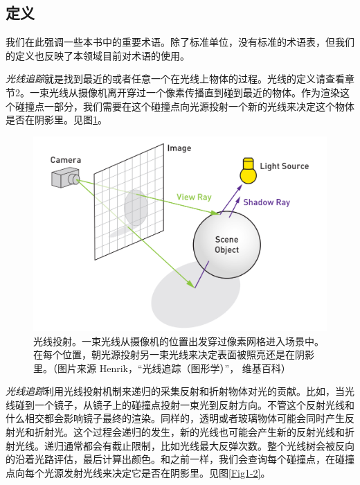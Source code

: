 \documentclass[12pt]{article}
\begin{document}
\subsection{定义}
我们在此强调一些本书中的重要术语。除了标准单位，没有标准的术语表，但我们的定义也反映了本领域目前对术语的使用。
 
\textit{光线追踪}就是找到最近的或者任意一个在光线上物体的过程。光线的定义请查看章节2。一束光线从摄像机离开穿过一个像素传播直到碰到最近的物体。作为渲染这个碰撞点一部分，我们需要在这个碰撞点向光源投射一个新的光线来决定这个物体是否在阴影里。见图\ref{Fig1-1}。

\begin{figure}
	\centering
	\includegraphics[width=12.0cm]{Fig1-1.png}
	\caption{光线投射。一束光线从摄像机的位置出发穿过像素网格进入场景中。在每个位置，朝光源投射另一束光线来决定表面被照亮还是在阴影里。（图片来源 Henrik，“光线追踪（图形学）”， 维基百科）}
	\label{Fig1-1}
\end{figure}
 
\textit{光线追踪}利用光线投射机制来递归的采集反射和折射物体对光的贡献。比如，当光线碰到一个镜子，从镜子上的碰撞点投射一束光到反射方向。不管这个反射光线和什么相交都会影响镜子最终的渲染。同样的，透明或者玻璃物体可能会同时产生反射光和折射光。这个过程会递归的发生，新的光线也可能会产生新的反射光线和折射光线。递归通常都会有截止限制，比如光线最大反弹次数。整个光线树会被反向的沿着光路评估，最后计算出颜色。和之前一样，我们会查询每个碰撞点，在碰撞点向每个光源发射光线来决定它是否在阴影里。见图\ref{Fig1-2}。
\end{document}
